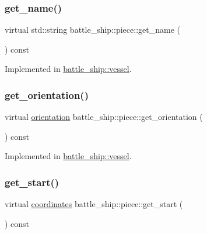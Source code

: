 \subsubsection{\texorpdfstring{get\+\_\+name()}{get\_name()}}
{\footnotesize\ttfamily virtual std\+::string battle\+\_\+ship\+::piece\+::get\+\_\+name (\begin{DoxyParamCaption}{ }\end{DoxyParamCaption}) const\hspace{0.3cm}{\ttfamily [pure virtual]}}



Implemented in \hyperlink{classbattle__ship_1_1vessel_a623a1b35355db117b5381a3a0f5774eb}{battle\+\_\+ship\+::vessel}.

\mbox{\label{classbattle__ship_1_1piece_a2cc01b1ec66bfb91df048401233e9618}} 
\subsubsection{\texorpdfstring{get\+\_\+orientation()}{get\_orientation()}}
{\footnotesize\ttfamily virtual \hyperlink{namespacebattle__ship_aed87488f0a73f0d0679fe343fb61c784}{orientation} battle\+\_\+ship\+::piece\+::get\+\_\+orientation (\begin{DoxyParamCaption}{ }\end{DoxyParamCaption}) const\hspace{0.3cm}{\ttfamily [pure virtual]}}



Implemented in \hyperlink{classbattle__ship_1_1vessel_a698c7811878e56b7ba7eb6d88e6ac13f}{battle\+\_\+ship\+::vessel}.

\mbox{\label{classbattle__ship_1_1piece_ab5010cea30b96f5afc758b2a9d0d43bc}} 
\subsubsection{\texorpdfstring{get\+\_\+start()}{get\_start()}}
{\footnotesize\ttfamily virtual \hyperlink{structbattle__ship_1_1coordinates}{coordinates} battle\+\_\+ship\+::piece\+::get\+\_\+start (\begin{DoxyParamCaption}{ }\end{DoxyParamCaption}) const\hspace{0.3cm}{\ttfamily [pure virtual]}}



